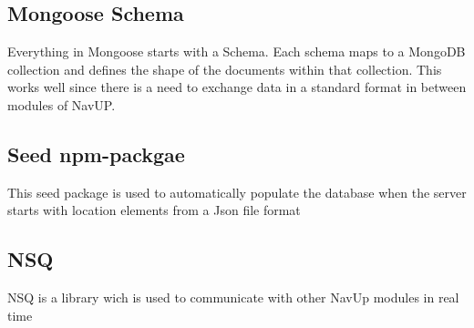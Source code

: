 \documentclass{article}
\begin{document}
	\subsection{Mongoose Schema}
		Everything in Mongoose starts with a Schema. Each schema maps to a MongoDB collection and defines the shape of the 		documents within that collection. 
		This works well since there is a need to exchange data in a standard format in between modules of NavUP.
	\subsection{Seed npm-packgae}
		This seed package is used to automatically populate the database when the server starts with location elements from a Json file format
	\subsection{NSQ}
		NSQ is a library wich is used to communicate with other NavUp modules in real time
\end{document}
